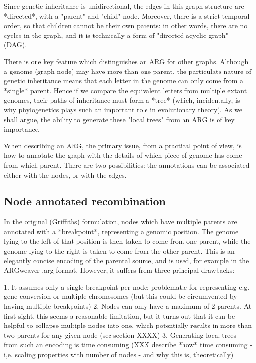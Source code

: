 \documentclass{article}
\begin{document}
Since genetic inheritance is unidirectional, the edges in this graph structure are *directed*,
with a "parent" and "child" node. Moreover, there is a strict temporal order, so that children
cannot be their own parents: in other words, there are no cycles in the graph, and it is
technically a form of "directed acyclic graph" (DAG).


There is one key feature which distinguishes an ARG for other graphs. Although a genome
(graph node) may have more than one parent, the particulate nature of genetic inheritance
means that each letter in the genome can only come from a *single* parent. Hence if we
compare the equivalent letters from multiple extant genomes, their paths of inheritance must
form a *tree* (which, incidentally, is why phylogenetics plays such an important role in evolutionary
theory). As we shall argue, the ability to generate these "local trees" from an ARG is of key
importance.

When describing an ARG, the primary issue, from a practical point of view, is how to annotate
the graph with the details of which piece of genome has come from which parent. There
are two possibilities: the annotations can be associated either with the nodes, or with the edges.

\subsection*{Node annotated recombination}

In the original (Griffiths) formulation, nodes which have multiple parents are annotated with a
*breakpoint*, representing a genomic position. The genome lying to the left of that position is then taken to come from one parent, while the genome lying to the right is taken to come from the other parent. This is an elegantly concise encoding of the parental source, and is used, for example in the ARGweaver .arg format. However, it suffers from three principal drawbacks:

1. It assumes only a single breakpoint per node: problematic for representing e.g. gene conversion or
multiple chromosomes (but this could be circumvented by having multiple breakpoints)
2. Nodes can only have a maximum of 2 parents. At first sight, this seems a reasonable limitation,
but it turns out that it can be helpful to collapse multiple nodes into one, which potentially results
in more than two parents for any given node (see section XXXX)
3. Generating local trees from such an encoding is time consuming (XXX describe *how* time consuming - i,e. scaling properties with number of nodes - and why this is, theoretically)
\end{document}
